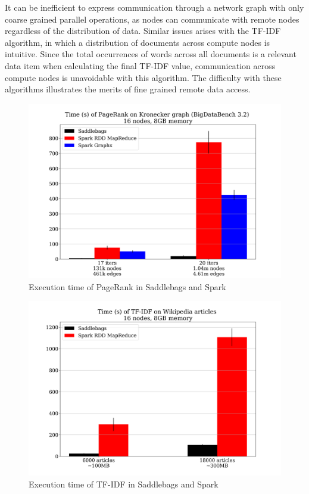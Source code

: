 \documentclass{uit-report}
\begin{document}
It can be inefficient to express communication through a network graph with only coarse grained parallel operations, as nodes can communicate with remote nodes regardless of the distribution of data. Similar issues arises with the TF-IDF algorithm, in which a distribution of documents across compute nodes is intuitive. Since the total occurrences of words across all documents is a relevant data item when calculating the final TF-IDF value, communication across compute nodes is unavoidable with this algorithm. The difficulty with these algorithms illustrates the merits of fine grained remote data access.

\newpage
\begin{figure}[H]
	\centering
	\includegraphics[width=15cm]{illustrations/png/sparkpagerank.png}
	\caption{Execution time of PageRank in Saddlebags and Spark}
	\label{fig:pagerankspark}
\end{figure}

\begin{figure}[H]
	\centering
	\includegraphics[width=15cm]{illustrations/png/sparktfidf.png}
	\caption{Execution time of TF-IDF in Saddlebags and Spark}
	\label{fig:tfidfspark}
\end{figure}
\newpage
\end{document}
